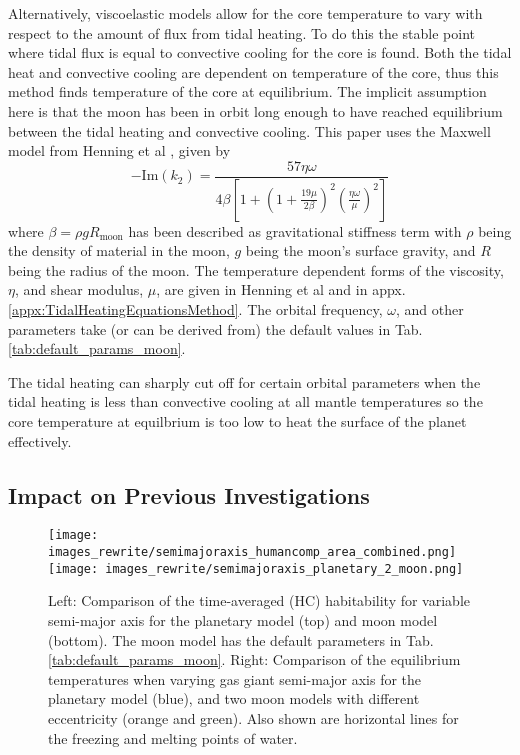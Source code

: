 \documentclass[12pt, onecolumn]{revtex4-2}    %
\begin{document}
Alternatively, viscoelastic models allow for the core temperature to vary with respect to the amount of flux from tidal heating.
To do this the stable point where tidal flux is equal to convective cooling for the core is found.
Both the tidal heat and convective cooling are dependent on temperature of the core, thus this method finds temperature of the core at equilibrium.
The implicit assumption here is that the moon has been in orbit long enough to have reached equilibrium between the tidal heating and convective cooling.
This paper uses the Maxwell model from Henning et al \cite{Henning2009}, given by
\begin{equation}
  -\text{Im}(k_2) = \frac{57 \eta \omega} 
  {4 \beta \left[ 1 + \left(1 + \frac{19 \mu}{2 \beta}\right)^2 
  \left(\frac{\eta \omega}{\mu}\right)^2 \right]}
  \label{eq:imk2_maxwell}
\end{equation}
where $\beta = \rho g R_\text{moon}$ has been described as gravitational stiffness term with $\rho$ being the density of material in the moon, $g$ being the moon's surface gravity, and $R$ being the radius of the moon.
The temperature dependent forms of the viscosity, $\eta$, and shear modulus, $\mu$, are given in Henning et al \cite{DobosTurner2015} and in appx. \ref{appx:TidalHeatingEquationsMethod}. 
The orbital frequency, $\omega$, and other parameters take (or can be derived from) the default values in Tab. \ref{tab:default_params_moon}.

The tidal heating can sharply cut off for certain orbital parameters when the tidal heating is less than convective cooling at all mantle temperatures so the core temperature at equilbrium is too low to heat the surface of the planet effectively.


\subsection{Impact on Previous Investigations} \label{ssec:Impact_previous_results}
%
\begin{figure}[t]
  \texttt{[image: images\_rewrite/semimajoraxis\_humancomp\_area\_combined.png]}
  \texttt{[image: images\_rewrite/semimajoraxis\_planetary\_2\_moon.png]}
  \caption{
    Left: Comparison of the time-averaged (HC) habitability for variable semi-major axis for the planetary model (top) and moon model (bottom). 
    The moon model has the default parameters in Tab. \ref{tab:default_params_moon}.
    Right: Comparison of the equilibrium temperatures when varying gas giant semi-major axis for the planetary model (blue), and two moon models with different eccentricity (orange and green).
    Also shown are horizontal lines for the freezing and melting points of water.
  }
  \label{fig:semimajoraxiscomparision}
\end{figure}
\end{document}
